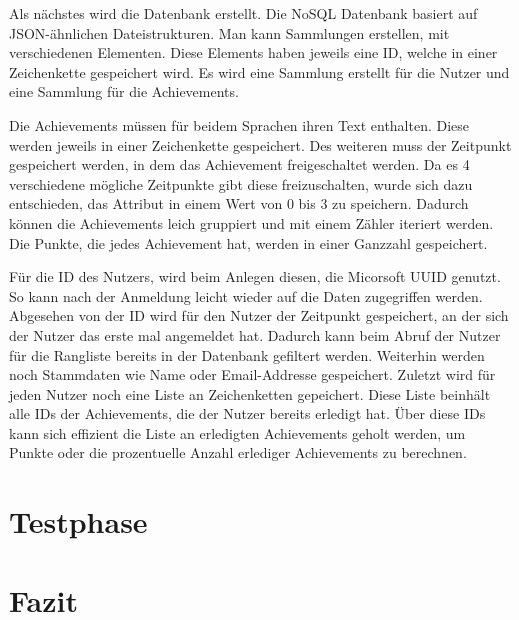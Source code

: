 \documentclass[12pt]{article}
\begin{document}
Als nächstes wird die Datenbank erstellt. Die NoSQL Datenbank basiert auf JSON-ähnlichen
Dateistrukturen. Man kann Sammlungen erstellen, mit verschiedenen Elementen. Diese Elements haben jeweils eine ID, welche
in einer Zeichenkette gespeichert wird. Es wird eine Sammlung erstellt für die Nutzer
und eine Sammlung für die Achievements. 

Die Achievements müssen für beidem Sprachen ihren Text enthalten. Diese werden jeweils in einer Zeichenkette gespeichert.
Des weiteren muss der Zeitpunkt gespeichert werden, in dem das Achievement freigeschaltet werden. Da es 4 verschiedene
mögliche Zeitpunkte gibt diese freizuschalten, wurde sich dazu entschieden, das Attribut in einem Wert von 0 bis 3 zu speichern.
Dadurch können die Achievements leich gruppiert und mit einem Zähler iteriert werden.
Die Punkte, die jedes Achievement hat, werden in einer Ganzzahl gespeichert.

Für die ID des Nutzers, wird beim Anlegen diesen, die Micorsoft UUID genutzt. So kann nach der Anmeldung leicht wieder auf die
Daten zugegriffen werden. Abgesehen von der ID wird für den Nutzer der Zeitpunkt gespeichert, an der sich der Nutzer das erste mal
angemeldet hat. Dadurch kann beim Abruf der Nutzer für die Rangliste bereits in der Datenbank gefiltert werden.
Weiterhin werden noch Stammdaten wie Name oder Email-Addresse gespeichert.
Zuletzt wird für jeden Nutzer noch eine Liste an Zeichenketten gepeichert. Diese Liste beinhält alle IDs der Achievements, die der
Nutzer bereits erledigt hat. Über diese IDs kann sich effizient die Liste an erledigten Achievements geholt werden, um Punkte oder
die prozentuelle Anzahl erlediger Achievements zu berechnen.


%
%

\section{Testphase}



%
%

\section{Fazit}
\end{document}
